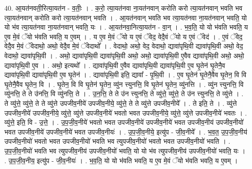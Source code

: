 \documentclass[17pt]{extarticle}
\begin{document}
40. आ॒यत॑नवती॒रित्या॒यत॑न - व॒तीः॒ । . क॒रो॒ त्या॒यत॑नवा ना॒यत॑नवान् करोति करो त्या॒यत॑नवान् भवति भव त्या॒यत॑नवान् करोति करो त्या॒यत॑नवान् भवति । . आ॒यत॑नवान् भवति भव त्या॒यत॑नवा ना॒यत॑नवान् भवति॒ यो यो भ॑व त्या॒यत॑नवा ना॒यत॑नवान् भवति॒ यः । . आ॒यत॑नवा॒नित्या॒यत॑न - वा॒न् । . भ॒व॒ति॒ यो यो भ॑वति भवति॒ य ए॒व मे॒वं ॅयो भ॑वति भवति॒ य ए॒वम् । . य ए॒व मे॒वं ॅयो य ए॒वं ॅवेद॒ वेदै॒वं ॅयो य ए॒वं ॅवेद॑ । . ए॒वं ॅवेद॒ वेदै॒व मे॒वं ॅवेदाथो॒ अथो॒ वेदै॒व मे॒वं ॅवेदाथो᳚ । . वेदाथो॒ अथो॒ वेद॒ वेदाथो॒ द्यावा॑पृथि॒वी द्यावा॑पृथि॒वी अथो॒ वेद॒ वेदाथो॒ द्यावा॑पृथि॒वी । . अथो॒ द्यावा॑पृथि॒वी द्यावा॑पृथि॒वी अथो॒ अथो॒ द्यावा॑पृथि॒वी ए॒वैव द्यावा॑पृथि॒वी अथो॒ अथो॒ द्यावा॑पृथि॒वी ए॒व । . अथो॒ इत्यथो᳚ । . द्यावा॑पृथि॒वी ए॒वैव द्यावा॑पृथि॒वी द्यावा॑पृथि॒वी ए॒व घृ॒तेन॑ घृ॒तेनै॒व द्यावा॑पृथि॒वी द्यावा॑पृथि॒वी ए॒व घृ॒तेन॑ । . द्यावा॑पृथि॒वी इति॒ द्यावा᳚ - पृ॒थि॒वी । . ए॒व घृ॒तेन॑ घृ॒तेनै॒वैव घृ॒तेन॒ वि वि घृ॒तेनै॒वैव घृ॒तेन॒ वि । . घृ॒तेन॒ वि वि घृ॒तेन॑ घृ॒तेन॒ व्यु॑न त्त्युनत्ति॒ वि घृ॒तेन॑ घृ॒तेन॒ व्यु॑नत्ति । . व्यु॑न त्त्युनत्ति॒ वि व्यु॑नत्ति॒ ते ते उ॑नत्ति॒ वि व्यु॑नत्ति॒ ते । . उ॒न॒त्ति॒ ते ते उ॑न त्त्युनत्ति॒ ते व्यु॑त्ते॒ व्यु॑त्ते॒ ते उ॑न त्त्युनत्ति॒ ते व्यु॑त्ते । . ते व्यु॑त्ते॒ व्यु॑त्ते॒ ते ते व्यु॑त्ते उपजीव॒नीये॑ उपजीव॒नीये॒ व्यु॑त्ते॒ ते ते व्यु॑त्ते उपजीव॒नीये᳚ । . ते इति॒ ते । . व्यु॑त्ते उपजीव॒नीये॑ उपजीव॒नीये॒ व्यु॑त्ते॒ व्यु॑त्ते उपजीव॒नीये॑ भवतो भवत उपजीव॒नीये॒ व्यु॑त्ते॒ व्यु॑त्ते उपजीव॒नीये॑ भवतः । . व्यु॑त्ते॒ इति॒ वि - उ॒त्ते॒ । . उ॒प॒जी॒व॒नीये॑ भवतो भवत उपजीव॒नीये॑ उपजीव॒नीये॑ भवत उपजीव॒नीय॑ उपजीव॒नीयो॑ भवत उपजीव॒नीये॑ उपजीव॒नीये॑ भवत उपजीव॒नीयः॑ । . उ॒प॒जी॒व॒नीये॒ इत्यु॑प - जी॒व॒नीये᳚ । . भ॒व॒त॒ उ॒प॒जी॒व॒नीय॑ उपजीव॒नीयो॑ भवतो भवत उपजीव॒नीयो॑ भवति भव त्युपजीव॒नीयो॑ भवतो भवत उपजीव॒नीयो॑ भवति । . उ॒प॒जी॒व॒नीयो॑ भवति भव त्युपजीव॒नीय॑ उपजीव॒नीयो॑ भवति॒ यो यो भ॑व त्युपजीव॒नीय॑ उपजीव॒नीयो॑ भवति॒ यः । . उ॒प॒जी॒व॒नीय॒ इत्यु॑प - जी॒व॒नीयः॑ । . भ॒व॒ति॒ यो यो भ॑वति भवति॒ य ए॒व मे॒वं ॅयो भ॑वति भवति॒ य ए॒वम् । \newline
\pagebreak
{}
\end{document}
